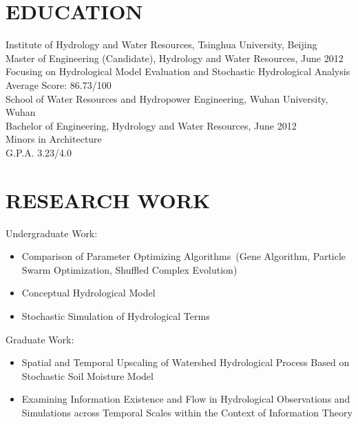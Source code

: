 \documentclass{res}
\begin{document}
 


\address{\bf  PRESENT ADDRESS\\\#310 New Hydrolic Buiding\\Tsinghua University, Beijing 100001 \\+86 13366720253}
\address{\bf PERMANENT ADDRESS \\ \#102 Residential Building  \\  Dongguan Middle School
, Feixian 273400 \\  +86 0539-5012705}
                                  
\begin{resume}

         
\section{EDUCATION}      

    Institute of Hydrology and Water Resources, Tsinghua University, Beijing  \\        
    Master of Engineering (Candidate), Hydrology and Water Resources, June 2012   \\       
    Focusing on Hydrological Model Evaluation and Stochastic Hydrological Analysis     \\         
    Average Score: 86.73/100 \\
 
    School of Water Resources and Hydropower Engineering, Wuhan University, Wuhan  \\        
    Bachelor of Engineering, Hydrology and Water Resources, June 2012   \\        
    Minors in Architecture\\        
    G.P.A. 3.23/4.0  
           

\section{RESEARCH WORK}
 
Undergraduate Work: 
\begin{itemize}
\item Comparison of Parameter Optimizing Algorithms~(Gene Algorithm, Particle Swarm Optimization, Shuffled Complex Evolution)
\item Conceptual Hydrological Model  
\item Stochastic Simulation of Hydrological Terms
\end{itemize} 
Graduate Work:
\begin{itemize}
\item Spatial and Temporal Upscaling of Watershed Hydrological Process Based on Stochastic Soil Moisture Model
\item Examining Information Existence and Flow in Hydrological Observations and Simulations across Temporal Scales within the Context of Information Theory
\end{itemize}


\end{resume}
\end{document}
